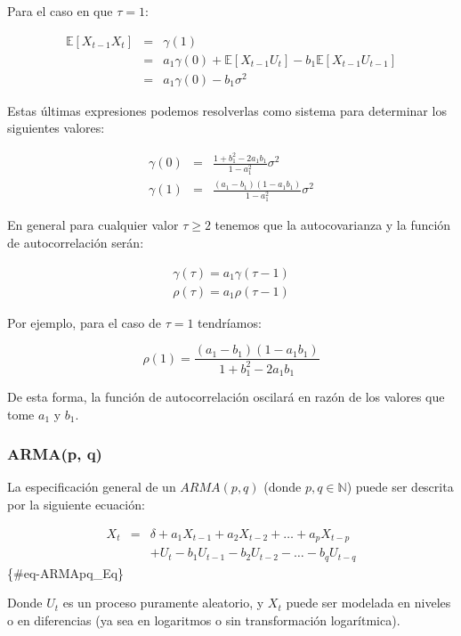 \documentclass[
  a4paper,
]{article}
\begin{document}
Para el caso en que \(\tau = 1\):

\begin{eqnarray}
    \mathbb{E}[X_{t-1} X_t] & = & \gamma(1) \nonumber \\
    & = & a_1 \gamma(0) + \mathbb{E}[X_{t-1} U_t] - b_1 \mathbb{E}[X_{t-1} U_{t-1}] \nonumber \\
    & = & a_1 \gamma(0) - b_1 \sigma^2
\end{eqnarray}

Estas últimas expresiones podemos resolverlas como sistema para
determinar los siguientes valores:

\begin{eqnarray}
    \gamma(0) & = & \frac{1 + b_1^2 - 2 a_1 b_1}{1 - a_1^2} \sigma^2 \\
    \gamma(1) & = & \frac{(a_1 - b_1)(1 - a_1 b_1)}{1 - a_1^2} \sigma^2
\end{eqnarray}

En general para cualquier valor \(\tau \geq 2\) tenemos que la
autocovarianza y la función de autocorrelación serán:

\begin{eqnarray}
    \gamma(\tau) = a_1 \gamma(\tau - 1) \\
    \rho(\tau) = a_1 \rho(\tau - 1)
\end{eqnarray}

Por ejemplo, para el caso de \(\tau = 1\) tendríamos:

\[
\rho(1) = \frac{(a_1 - b_1)(1 - a_1 b_1)}{1 + b_1^2 - 2 a_1 b_1}
\]

De esta forma, la función de autocorrelación oscilará en razón de los
valores que tome \(a_1\) y \(b_1\).

\hypertarget{armap-q}{%
\subsubsection{ARMA(p, q)}\label{armap-q}}

La especificación general de un \(ARMA(p, q)\) (donde
\(p, q \in \mathbb{N}\)) puede ser descrita por la siguiente ecuación:

\begin{eqnarray}
    X_t & = & \delta + a_1 X_{t - 1} + a_2 X_{t - 2} + \ldots + a_p X_{t - p} \nonumber \\
    &   & + U_t - b_1 U_{t - 1} - b_2  U_{t - 2} - \ldots - b_q  U_{t - q}
\end{eqnarray} \{\#eq-ARMApq\_Eq\}

Donde \(U_t\) es un proceso puramente aleatorio, y \(X_t\) puede ser
modelada en niveles o en diferencias (ya sea en logaritmos o sin
transformación logarítmica).
\end{document}
